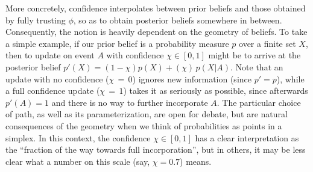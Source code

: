 \documentclass{uai2023} %
\begin{document}
{%
More concretely, confidence interpolates between prior beliefs and those obtained by fully trusting $\phi$, so as to obtain posterior beliefs somewhere in between.
Consequently, the notion is heavily dependent on the geometry of beliefs.
To take a simple example,
if our prior belief is a probability measure $p$ over a finite set $X$, then to update on event $A$ with confidence $\chi \in [0,1]$ might be to arrive at the posterior belief $p'(X) = (1-\chi) p(X) + (\chi)\, p(X|A)$.
Note that
an update with no confidence ($\chi{\,=\,}0$) ignores new information (since $p' \!=\! p$),
while a
full confidence update ($\chi{\,=\,}1$) takes it as seriously as possible,
since afterwards $p'(A) \!=\! 1$ and there is no way to further incorporate $A$.
%
%
The particular choice of path, as well as its parameterization,
are open for debate, but are natural consequences of the geometry when we think of probabilities as points in a simplex.
%
In this context,
the confidence $\chi \in [0,1]$ has a clear interpretation as the ``fraction of the way towards full incorporation'',
but in others,
it may be
less clear what a number on this scale (say, $\chi{=}0.7$) means.
}
\end{document}
